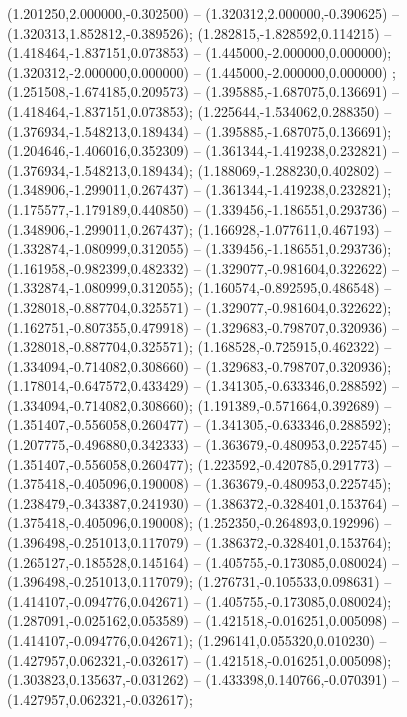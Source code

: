  (1.201250,2.000000,-0.302500) -- (1.320312,2.000000,-0.390625) -- (1.320313,1.852812,-0.389526);
 (1.282815,-1.828592,0.114215) -- (1.418464,-1.837151,0.073853) -- (1.445000,-2.000000,0.000000);
 (1.320312,-2.000000,0.000000) -- (1.445000,-2.000000,0.000000) ;
 (1.251508,-1.674185,0.209573) -- (1.395885,-1.687075,0.136691) -- (1.418464,-1.837151,0.073853);
 (1.225644,-1.534062,0.288350) -- (1.376934,-1.548213,0.189434) -- (1.395885,-1.687075,0.136691);
 (1.204646,-1.406016,0.352309) -- (1.361344,-1.419238,0.232821) -- (1.376934,-1.548213,0.189434);
 (1.188069,-1.288230,0.402802) -- (1.348906,-1.299011,0.267437) -- (1.361344,-1.419238,0.232821);
 (1.175577,-1.179189,0.440850) -- (1.339456,-1.186551,0.293736) -- (1.348906,-1.299011,0.267437);
 (1.166928,-1.077611,0.467193) -- (1.332874,-1.080999,0.312055) -- (1.339456,-1.186551,0.293736);
 (1.161958,-0.982399,0.482332) -- (1.329077,-0.981604,0.322622) -- (1.332874,-1.080999,0.312055);
 (1.160574,-0.892595,0.486548) -- (1.328018,-0.887704,0.325571) -- (1.329077,-0.981604,0.322622);
 (1.162751,-0.807355,0.479918) -- (1.329683,-0.798707,0.320936) -- (1.328018,-0.887704,0.325571);
 (1.168528,-0.725915,0.462322) -- (1.334094,-0.714082,0.308660) -- (1.329683,-0.798707,0.320936);
 (1.178014,-0.647572,0.433429) -- (1.341305,-0.633346,0.288592) -- (1.334094,-0.714082,0.308660);
 (1.191389,-0.571664,0.392689) -- (1.351407,-0.556058,0.260477) -- (1.341305,-0.633346,0.288592);
 (1.207775,-0.496880,0.342333) -- (1.363679,-0.480953,0.225745) -- (1.351407,-0.556058,0.260477);
 (1.223592,-0.420785,0.291773) -- (1.375418,-0.405096,0.190008) -- (1.363679,-0.480953,0.225745);
 (1.238479,-0.343387,0.241930) -- (1.386372,-0.328401,0.153764) -- (1.375418,-0.405096,0.190008);
 (1.252350,-0.264893,0.192996) -- (1.396498,-0.251013,0.117079) -- (1.386372,-0.328401,0.153764);
 (1.265127,-0.185528,0.145164) -- (1.405755,-0.173085,0.080024) -- (1.396498,-0.251013,0.117079);
 (1.276731,-0.105533,0.098631) -- (1.414107,-0.094776,0.042671) -- (1.405755,-0.173085,0.080024);
 (1.287091,-0.025162,0.053589) -- (1.421518,-0.016251,0.005098) -- (1.414107,-0.094776,0.042671);
 (1.296141,0.055320,0.010230) -- (1.427957,0.062321,-0.032617) -- (1.421518,-0.016251,0.005098);
 (1.303823,0.135637,-0.031262) -- (1.433398,0.140766,-0.070391) -- (1.427957,0.062321,-0.032617);
